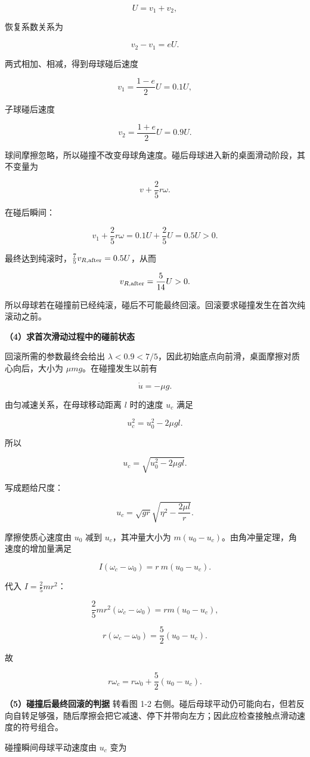 \documentclass[12pt,a4paper,UTF8]{ctexart}
\begin{document}
\[U=v_1+v_2,\]

恢复系数关系为

\[v_2-v_1=eU.\]

两式相加、相减，得到母球碰后速度

\[v_1=\frac{1-e}{2}U=0.1U,\]

子球碰后速度

\[v_2=\frac{1+e}{2}U=0.9U.\]

球间摩擦忽略，所以碰撞不改变母球角速度。碰后母球进入新的桌面滑动阶段，其不变量为

\[v+\frac25r\omega.
\]

在碰后瞬间：

\[v_1+\frac25r\omega=0.1U+\frac25U=0.5U>0.\]

最终达到纯滚时，\(\frac75v_{R,\rm after}=0.5U\)，从而

\[v_{R,\rm after}=\frac5{14}U>0.\]

所以母球若在碰撞前已经纯滚，碰后不可能最终回滚。回滚要求碰撞发生在首次纯滚动之前。

\textbf{（4）求首次滑动过程中的碰前状态}

回滚所需的参数最终会给出
\(\lambda<0.9<7/5\)，因此初始底点向前滑，桌面摩擦对质心向后，大小为
\(\mu mg\)。在碰撞发生以前有

\[\dot u=-\mu g.\]

由匀减速关系，在母球移动距离 \(l\) 时的速度 \(u_c\) 满足

\[u_c^2=u_0^2-2\mu gl.\]

所以

\[\boxed{u_c=\sqrt{u_0^2-2\mu gl}}.\]

写成题给尺度：

\[u_c=\sqrt{gr}\sqrt{\eta^2-\frac{2\mu l}{r}}.\]

摩擦使质心速度由 \(u_0\) 减到 \(u_c\)，其冲量大小为
\(m(u_0-u_c)\)。由角冲量定理，角速度的增加量满足

\[I(\omega_c-\omega_0)=r\ m(u_0-u_c).\]

代入 \(I=\frac25mr^2\)：

\[\frac25mr^2(\omega_c-\omega_0)=rm(u_0-u_c),\]

\[r(\omega_c-\omega_0)=\frac52(u_0-u_c).\]

故

\[r\omega_c=r\omega_0+\frac52(u_0-u_c).\]

\textbf{（5）碰撞后最终回滚的判据} 转看图 1-2
右侧。碰后母球平动仍可能向右，但若反向自转足够强，随后摩擦会把它减速、停下并带向左方；因此应检查接触点滑动速度的符号组合。

碰撞瞬间母球平动速度由 \(u_c\) 变为
\end{document}

